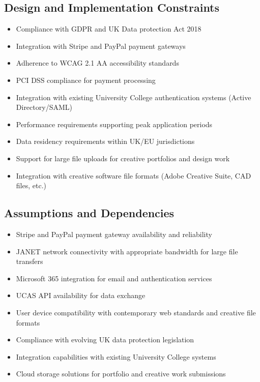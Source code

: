 \documentclass[11pt]{article}
\begin{document}
\subsection{Design and Implementation Constraints}
\begin{itemize}
    \item Compliance with GDPR and UK Data protection Act 2018
    \item Integration with Stripe and PayPal payment gateways
    \item Adherence to WCAG 2.1 AA accessibility standards
    \item PCI DSS compliance for payment processing
    \item Integration with existing University College authentication systems (Active Directory/SAML)
    \item Performance requirements supporting peak application periods
    \item Data residency requirements within UK/EU jurisdictions
    \item Support for large file uploads for creative portfolios and design work
    \item Integration with creative software file formats (Adobe Creative Suite, CAD files, etc.)
\end{itemize}

\subsection{Assumptions and Dependencies}
\begin{itemize}
    \item Stripe and PayPal payment gateway availability and reliability
    \item JANET network connectivity with appropriate bandwidth for large file transfers
    \item Microsoft 365 integration for email and authentication services
    \item UCAS API availability for data exchange
    \item User device compatibility with contemporary web standards and creative file formats
    \item Compliance with evolving UK data protection legislation
    \item Integration capabilities with existing University College systems
    \item Cloud storage solutions for portfolio and creative work submissions
\end{itemize}
\end{document}
